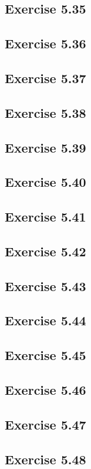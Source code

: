 \documentclass[../Marcus.tex]{subfiles}
\begin{document}
\subsection*{Exercise 5.35}

\subsection*{Exercise 5.36}

\subsection*{Exercise 5.37}

\subsection*{Exercise 5.38}

\subsection*{Exercise 5.39}

\subsection*{Exercise 5.40}

\subsection*{Exercise 5.41}

\subsection*{Exercise 5.42}

\subsection*{Exercise 5.43}

\subsection*{Exercise 5.44}

\subsection*{Exercise 5.45}

\subsection*{Exercise 5.46}

\subsection*{Exercise 5.47}

\subsection*{Exercise 5.48}
\phantom{}
\end{document}
